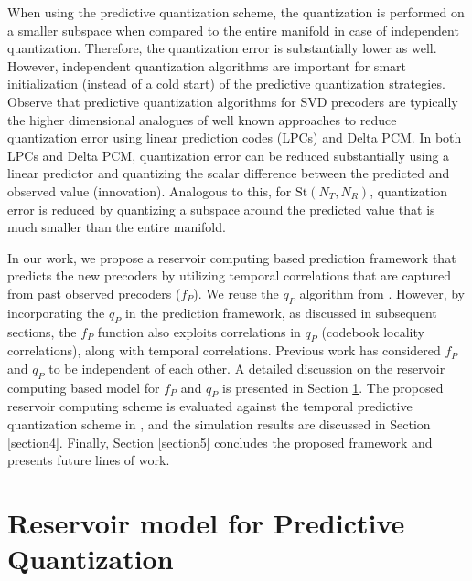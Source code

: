 \documentclass[conference]{IEEEtran}
\begin{document}
When using the predictive quantization scheme, the quantization is performed on a smaller subspace when compared to the entire manifold in case of independent quantization.
Therefore, the quantization error is substantially lower as well.
However, independent quantization algorithms are important for smart initialization (instead of a cold start) of the predictive quantization strategies.
Observe that predictive quantization algorithms for SVD precoders are typically the higher dimensional analogues of well known approaches to reduce quantization error using linear prediction codes (LPCs) and Delta PCM.
In both LPCs and Delta PCM, quantization error can be reduced substantially using a linear predictor and quantizing the scalar difference between the predicted and observed value (innovation).
Analogous to this, for $\text{St}(N_T,N_R)$, quantization error is reduced by quantizing a subspace around the predicted value that is much smaller than the entire manifold.

In our work, we propose a reservoir computing based prediction framework that predicts the new precoders by utilizing temporal correlations that are captured from past observed precoders ($f_P$).
We reuse the $q_P$ algorithm from \cite{Gupt1905:Predictive,6891198}.
However, by incorporating the $q_P$ in the prediction framework, as discussed in subsequent sections, the $f_P$ function also exploits correlations in $q_P$ (codebook locality correlations), along with temporal correlations.
Previous work \cite{Gupt1905:Predictive,6891198} has considered $f_P$ and $q_P$ to be independent of each other.
A detailed discussion on the reservoir computing based model for $f_P$ and $q_P$ is presented in Section \ref{section3}.
The proposed reservoir computing scheme is evaluated against the temporal predictive quantization scheme in \cite{6891198}, and the simulation results are discussed in Section \ref{section4}.
Finally, Section \ref{section5} concludes the proposed framework and presents future lines of work.

\section{Reservoir model for Predictive Quantization}
\label{section3}
\end{document}
